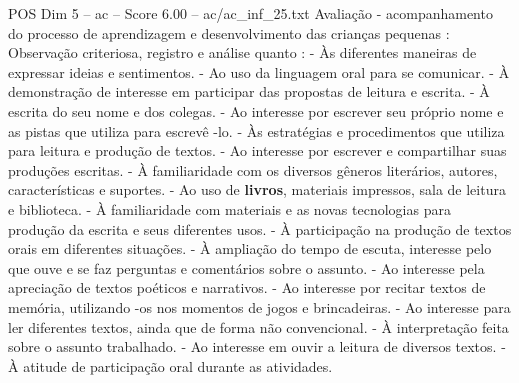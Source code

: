 \begin{textsample}{POS Dim 5 – ac – Score 6.00 – ac/ac\_inf\_25.txt}
Avaliação - acompanhamento do processo de aprendizagem e desenvolvimento das crianças pequenas : Observação criteriosa, registro e análise quanto : - Às diferentes maneiras de expressar ideias e sentimentos. - Ao uso da linguagem oral para se comunicar. - À demonstração de interesse em participar das propostas de leitura e escrita. - À escrita do seu nome e dos colegas. - Ao interesse por escrever seu próprio nome e as pistas que utiliza para escrevê -lo. - Às estratégias e procedimentos que utiliza para leitura e produção de textos. - Ao interesse por escrever e compartilhar suas produções escritas. - À familiaridade com os diversos gêneros literários, autores, características e suportes. - Ao uso de \textbf{livros}, materiais impressos, sala de leitura e biblioteca. - À familiaridade com materiais e as novas tecnologias para produção da escrita e seus diferentes usos. - À participação na produção de textos orais em diferentes situações. - À ampliação do tempo de escuta, interesse pelo que ouve e se faz perguntas e comentários sobre o assunto. - Ao interesse pela apreciação de textos poéticos e narrativos. - Ao interesse por recitar textos de memória, utilizando -os nos momentos de jogos e brincadeiras. - Ao interesse para ler diferentes textos, ainda que de forma não convencional. - À interpretação feita sobre o assunto trabalhado. - Ao interesse em ouvir a leitura de diversos textos. - À atitude de participação oral durante as atividades.

\end{textsample}
